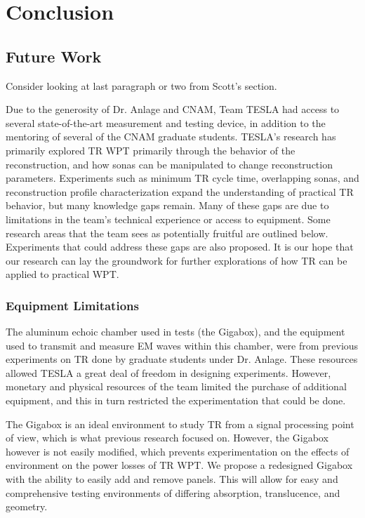 \chapter{Conclusion}

\label{ch:conclusion}


\section{Future Work}

Consider looking at last paragraph or two from Scott’s section.

Due to the generosity of Dr. Anlage and CNAM, Team TESLA had access to several state-of-the-art measurement and testing device, in addition to the mentoring of several of the CNAM graduate students.
TESLA’s research has primarily explored TR WPT primarily through the behavior of the reconstruction, and how sonas can be manipulated to change reconstruction parameters.  Experiments such as minimum TR cycle time, overlapping sonas, and reconstruction profile characterization expand the understanding of practical TR behavior, but many knowledge gaps remain.  Many of these gaps are due to limitations in the team’s technical experience or access to equipment.  Some research areas that the team sees as potentially fruitful are outlined below.  Experiments that could address these gaps are also proposed.  It is our hope that our research can lay the groundwork for further explorations of how TR can be applied to practical WPT.

\subsection{Equipment Limitations}

The aluminum echoic chamber used in tests (the Gigabox), and the equipment used to transmit and measure EM waves within this chamber, were from previous experiments on TR done by graduate students under Dr. Anlage.  These resources allowed TESLA a great deal of freedom in designing experiments.  However, monetary and physical resources of the team limited the purchase of additional equipment, and this in turn restricted the experimentation that could be done.

The Gigabox is an ideal environment to study TR from a signal processing point of view, which is what previous research focused on. However, the Gigabox however is not easily modified, which prevents experimentation on the effects of environment on the power losses of TR WPT.  We propose a redesigned Gigabox with the ability to easily add and remove panels.  This will allow for easy and comprehensive testing environments of differing absorption, translucence, and geometry.

